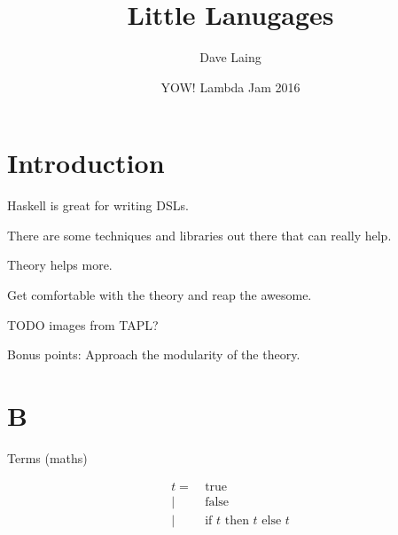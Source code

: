 \documentclass{beamer}
\title{Little Lanugages}
\author{Dave Laing}
\date{YOW! Lambda Jam 2016}
\begin{document}
\begin{frame}
\maketitle
\end{frame}

\section{Introduction}

\begin{frame}[c]
  \begin{center}
    Haskell is great for writing DSLs.
  \end{center}
\end{frame}

\begin{frame}[c]
  \begin{center}
    There are some techniques and libraries out there that can really help.
  \end{center}
\end{frame}

\begin{frame}[c]
  \begin{center}
    Theory helps more.
  \end{center}
\end{frame}

\begin{frame}[c]
  \begin{center}
    Get comfortable with the theory and reap the awesome.
  \end{center}
\end{frame}

TODO images from TAPL?

\begin{frame}[c]
  \begin{center}
   Bonus points: Approach the modularity of the theory. 
  \end{center}
\end{frame}

\section{B}

\begin{frame}[c]
  \begin{center}
Terms (maths)
  \end{center}
  \begin{displaymath}
    \begin{aligned}
t =& \ \text{true} \\
  |& \ \text{false}  \\
  |& \ \text{if $t$ then $t$ else $t$}
    \end{aligned}
  \end{displaymath}
\end{frame}
\end{document}
